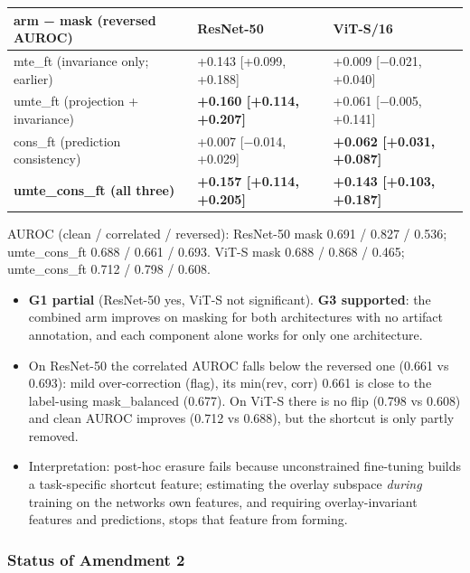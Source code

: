 {{ %
\begin{longtable}[]{@{}lll@{}}
\toprule\noalign{}
arm − mask (reversed AUROC) & ResNet-50 & ViT-S/16 \\
\midrule\noalign{}
\endhead
\bottomrule\noalign{}
\endlastfoot
mte\_ft (invariance only; earlier) & +0.143 {[}+0.099, +0.188{]} & +0.009 {[}−0.021, +0.040{]} \\
umte\_ft (projection + invariance) & \textbf{+0.160 {[}+0.114, +0.207{]}} & +0.061 {[}−0.005, +0.141{]} \\
cons\_ft (prediction consistency) & +0.007 {[}−0.014, +0.029{]} & \textbf{+0.062 {[}+0.031, +0.087{]}} \\
\textbf{umte\_cons\_ft (all three)} & \textbf{+0.157 {[}+0.114, +0.205{]}} & \textbf{+0.143 {[}+0.103, +0.187{]}} \\
\end{longtable}
}

AUROC (clean / correlated / reversed): ResNet-50 mask 0.691 / 0.827 / 0.536; umte\_cons\_ft 0.688 / 0.661 / 0.693.
ViT-S mask 0.688 / 0.868 / 0.465; umte\_cons\_ft 0.712 / 0.798 / 0.608.

\begin{itemize}

\item
  \textbf{G1 partial} (ResNet-50 yes, ViT-S not significant). \textbf{G3 supported}: the combined arm improves on masking for
  both architectures with no artifact annotation, and each component alone works for only one architecture.
\item
  On ResNet-50 the correlated AUROC falls below the reversed one (0.661 vs 0.693): mild over-correction (flag), its
  min(rev, corr) 0.661 is close to the label-using mask\_balanced (0.677). On ViT-S there is no flip (0.798 vs 0.608)
  and clean AUROC improves (0.712 vs 0.688), but the shortcut is only partly removed.
\item
  Interpretation: post-hoc erasure fails because unconstrained fine-tuning builds a task-specific shortcut feature;
  estimating the overlay subspace \emph{during} training on the network\textquotesingle s own features, and requiring overlay-invariant
  features and predictions, stops that feature from forming.
\end{itemize}

\subsubsection{Status of Amendment 2}\label{status-of-amendment-2}

}
